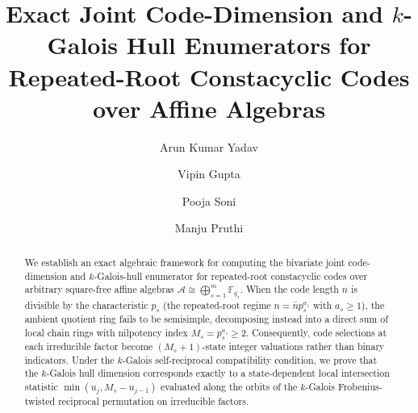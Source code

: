 \documentclass[preprint,12pt]{elsarticle}
\numberwithin{equation}{section}
\theoremstyle{plain}
\theoremstyle{definition}
\theoremstyle{remark}
\begin{document}
\begin{frontmatter}

\title{Exact Joint Code-Dimension and $k$-Galois Hull Enumerators for Repeated-Root Constacyclic Codes over Affine Algebras}

\author[inst1]{Arun Kumar Yadav}

\author[inst2]{Vipin Gupta}
\author[inst3]{Pooja Soni}
\author[inst4]{Manju Pruthi}





\begin{abstract}
We establish an exact algebraic framework for computing the bivariate joint code-dimension and $k$-Galois-hull enumerator for repeated-root constacyclic codes over arbitrary square-free affine algebras $\mathcal{A} \cong \bigoplus_{s=1}^m \mathbb{F}_{q_s}$. When the code length $n$ is divisible by the characteristic $p_s$ (the repeated-root regime $n = \bar{n} p_s^{a_s}$ with $a_s \ge 1$), the ambient quotient ring fails to be semisimple, decomposing instead into a direct sum of local chain rings with nilpotency index $M_s = p_s^{a_s} \ge 2$. Consequently, code selections at each irreducible factor become $(M_s+1)$-state integer valuations rather than binary indicators. Under the $k$-Galois self-reciprocal compatibility condition, we prove that the $k$-Galois hull dimension corresponds exactly to a state-dependent local intersection statistic $\min(u_j, M_s - u_{j-1})$ evaluated along the orbits of the $k$-Galois Frobenius-twisted reciprocal permutation on irreducible factors. 


\end{abstract}
\end{frontmatter}
\end{document}
